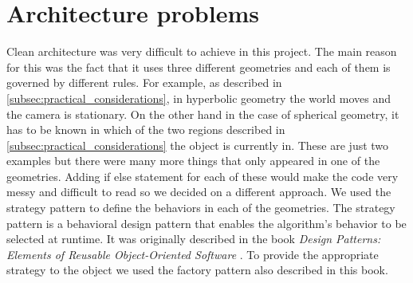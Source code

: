 \section{Architecture problems} \label{sec:architecture_problems}
Clean architecture was very difficult to achieve in this project.
The main reason for this was the fact that it uses three different geometries and each of them is governed by different rules.
For example, as described in \autoref{subsec:practical_considerations}, in hyperbolic geometry the world moves and the camera is stationary.
On the other hand in the case of spherical geometry, it has to be known in which of the two regions described in \autoref{subsec:practical_considerations} the object is currently in.
These are just two examples but there were many more things that only appeared in one of the geometries.
Adding if else statement for each of these would make the code very messy and difficult to read so we decided on a different approach.
We used the strategy pattern to define the behaviors in each of the geometries.
The strategy pattern is a behavioral design pattern that enables the algorithm's behavior to be selected at runtime.
It was originally described in the book \textit{Design Patterns: Elements of Reusable Object-Oriented Software} \cite{Design-Patterns}.
To provide the appropriate strategy to the object we used the factory pattern also described in this book.